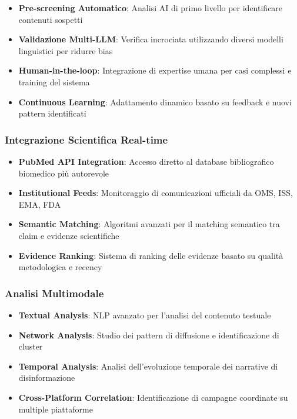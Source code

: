 \documentclass[12pt,a4paper]{report}
\begin{document}
\begin{itemize}
    \item \textbf{Pre-screening Automatico}: Analisi AI di primo livello per identificare contenuti sospetti
    \item \textbf{Validazione Multi-LLM}: Verifica incrociata utilizzando diversi modelli linguistici per ridurre bias
    \item \textbf{Human-in-the-loop}: Integrazione di expertise umana per casi complessi e training del sistema
    \item \textbf{Continuous Learning}: Adattamento dinamico basato su feedback e nuovi pattern identificati
\end{itemize}

\subsubsection{Integrazione Scientifica Real-time}

\begin{itemize}
    \item \textbf{PubMed API Integration}: Accesso diretto al database bibliografico biomedico più autorevole
    \item \textbf{Institutional Feeds}: Monitoraggio di comunicazioni ufficiali da OMS, ISS, EMA, FDA
    \item \textbf{Semantic Matching}: Algoritmi avanzati per il matching semantico tra claim e evidenze scientifiche
    \item \textbf{Evidence Ranking}: Sistema di ranking delle evidenze basato su qualità metodologica e recency
\end{itemize}

\subsubsection{Analisi Multimodale}

\begin{itemize}
    \item \textbf{Textual Analysis}: NLP avanzato per l'analisi del contenuto testuale
    \item \textbf{Network Analysis}: Studio dei pattern di diffusione e identificazione di cluster
    \item \textbf{Temporal Analysis}: Analisi dell'evoluzione temporale dei narrative di disinformazione
    \item \textbf{Cross-Platform Correlation}: Identificazione di campagne coordinate su multiple piattaforme
\end{itemize}
\end{document}
